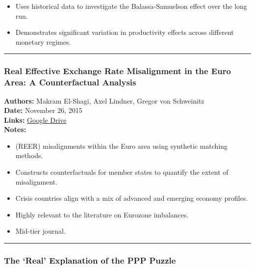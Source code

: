 \documentclass[
  11pt,
]{article}
\providecommand{\tightlist}{%
  \setlength{\itemsep}{0pt}\setlength{\parskip}{0pt}}
\begin{document}
\begin{itemize}
\tightlist
\item
  Uses historical data to investigate the Balassa-Samuelson effect over
  the long run.\\
\item
  Demonstrates significant variation in productivity effects across
  different monetary regimes.
\end{itemize}

\begin{center}\rule{0.5\linewidth}{0.5pt}\end{center}

\subsubsection{Real Effective Exchange Rate Misalignment in the Euro
Area: A Counterfactual
Analysis}\label{real-effective-exchange-rate-misalignment-in-the-euro-area-a-counterfactual-analysis}

\textbf{Authors:} Makram El-Shagi, Axel Lindner, Gregor von Schweinitz\\
\textbf{Date:} November 26, 2015\\
\textbf{Links:}
\href{https://drive.google.com/file/d/1rg_R7y6ti0Y7HCTl6L9Alxj7nUcQf6Cn/view?usp=sharing}{Google
Drive}\\
\textbf{Notes:}

\begin{itemize}
\tightlist
\item
  (REER) misalignments within the Euro area using synthetic matching
  methods.
\item
  Constructs counterfactuals for member states to quantify the extent of
  misalignment.
\item
  Crisis countries align with a mix of advanced and emerging economy
  profiles.
\item
  Highly relevant to the literature on Eurozone imbalances.
\item
  Mid-tier journal.
\end{itemize}

\begin{center}\rule{0.5\linewidth}{0.5pt}\end{center}

\subsubsection{The `Real' Explanation of the PPP
Puzzle}\label{the-real-explanation-of-the-ppp-puzzle}
\end{document}
